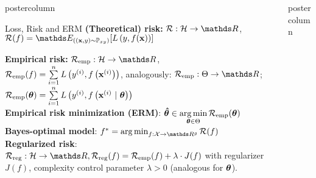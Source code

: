 \documentclass{beamer}
\begin{document}
\begin{frame}[fragile]{}
\begin{columns}
\begin{column}{.31\textwidth}
\begin{beamercolorbox}[center]{postercolumn}
\begin{minipage}{.98\textwidth}
{\begin{myblock}{Loss, Risk and ERM}
\textbf{(Theoretical) risk:} $\risk:  \Hspace \to \R $, 
$\riskf = \E_{(\xy \sim \Pxy)}[\Lxy]$
  
\textbf{Empirical risk:} $\riske:  \Hspace \to \R $, 
$\mathcal{R}_{\text{emp}}(f) = \sum\limits_{i=1}^n L\left(y^{(i)}, f\left(\mathbf{x}^{(i)}\right)\right)$,  analogously:
$\riske : \Theta \to \R$; $\mathcal{R}_{\text{emp}}(\bm{\theta}) = \sum\limits_{i=1}^n L\left(y^{(i)}, f\left(\mathbf{x}^{(i)} ~|~ \bm{\theta}\right)\right)$\\
  
\textbf{Empirical risk minimization (ERM)}:
$\bm{\hat\theta} \in \mathop{\mathrm{arg\,min}} \limits_{\bm{\theta} \in \Theta} \mathcal{R}_{\text{emp}}(\bm{\theta})$ \\

\textbf{Bayes-optimal model}: $\fbayes = \argmin_{f: \Xspace \rightarrow \R^g}  
\riskf$ \\

\textbf{Regularized risk}: $\riskr: \Hspace
\to \R, \riskrf = \riskef + \lambda \cdot J(f)$ with regularizer $J(f)$, 
complexity control parameter $\lambda > 0$ (analogous for $\bm{\theta}$).

\end{myblock}





				}
			\end{minipage}
		\end{beamercolorbox}
	\end{column}
	\begin{column}{.31\textwidth}
		\begin{beamercolorbox}[center]{postercolumn}
			\begin{minipage}{.98\textwidth}
				\parbox[t][\columnheight]{\textwidth}{


}
\end{minipage}
\end{beamercolorbox}
\end{column}
\end{columns}
\end{frame}
\end{document}
